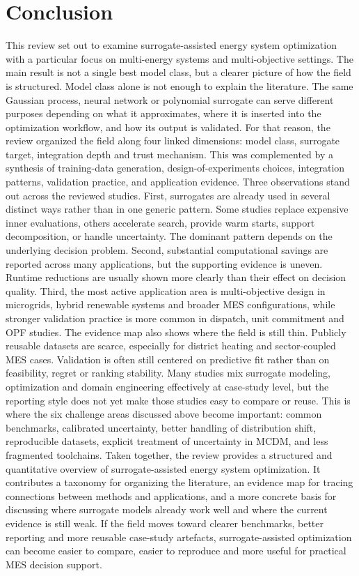 \section{Conclusion}
\label{sec:conclusion}
This review set out to examine surrogate-assisted energy system
optimization with a particular focus on multi-energy systems and
multi-objective settings. The main result is not a single best model
class, but a clearer picture of how the field is structured. Model class
alone is not enough to explain the literature. The same Gaussian
process, neural network or polynomial surrogate can serve different
purposes depending on what it approximates, where it is inserted into
the optimization workflow, and how its output is validated. For that
reason, the review organized the field along four linked dimensions:
model class, surrogate target, integration depth and trust mechanism.
This was complemented by a synthesis of training-data generation,
design-of-experiments choices, integration patterns, validation
practice, and application evidence.
Three observations stand out across the reviewed studies. First,
surrogates are already used in several distinct ways rather than in one
generic pattern. Some studies replace expensive inner evaluations,
others accelerate search, provide warm starts, support decomposition, or
handle uncertainty. The dominant pattern depends on the underlying
decision problem. Second, substantial computational savings are reported
across many applications, but the supporting evidence is uneven. Runtime
reductions are usually shown more clearly than their effect on decision
quality. Third, the most active application area is multi-objective
design in microgrids, hybrid renewable systems and broader MES
configurations, while stronger validation practice is more common in
dispatch, unit commitment and OPF studies.
The evidence map also shows where the field is still thin. Publicly
reusable datasets are scarce, especially for district heating and
sector-coupled MES cases. Validation is often still centered on
predictive fit rather than on feasibility, regret or ranking stability.
Many studies mix surrogate modeling, optimization and domain
engineering effectively at case-study level, but the reporting style
does not yet make those studies easy to compare or reuse. This is where
the six challenge areas discussed above become important: common
benchmarks, calibrated uncertainty, better handling of distribution
shift, reproducible datasets, explicit treatment of uncertainty in MCDM,
and less fragmented toolchains.
Taken together, the review provides a structured and quantitative
overview of surrogate-assisted energy system optimization. It contributes
a taxonomy for organizing the literature, an evidence map for tracing
connections between methods and applications, and a more concrete basis
for discussing where surrogate models already work well and where the
current evidence is still weak. If the field moves toward clearer
benchmarks, better reporting and more reusable case-study artefacts,
surrogate-assisted optimization can become easier to compare, easier to
reproduce and more useful for practical MES decision support.

